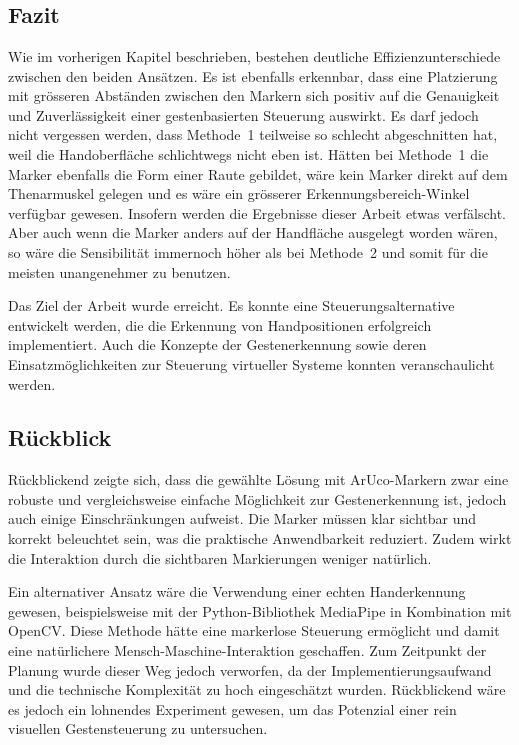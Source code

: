 \chapter{\chapFive}
\label{cha:chapter5} %

\begingroup
\fontsize{12pt}{14pt}\selectfont

\section{Fazit}
Wie im vorherigen Kapitel beschrieben, bestehen deutliche Effizienzunterschiede zwischen den beiden Ansätzen.
Es ist ebenfalls erkennbar, dass eine Platzierung mit grösseren Abständen zwischen den Markern sich positiv auf die Genauigkeit und Zuverlässigkeit einer gestenbasierten Steuerung auswirkt.
Es darf jedoch nicht vergessen werden, dass Methode~1 teilweise so schlecht abgeschnitten hat, weil die Handoberfläche schlichtwegs nicht eben ist.
Hätten bei Methode~1 die Marker ebenfalls die Form einer Raute gebildet, wäre kein Marker direkt auf dem Thenarmuskel gelegen und es wäre ein grösserer Erkennungsbereich-Winkel verfügbar gewesen.
Insofern werden die Ergebnisse dieser Arbeit etwas verfälscht.
Aber auch wenn die Marker anders auf der Handfläche ausgelegt worden wären, so wäre die Sensibilität immernoch höher als bei Methode~2 und somit für die meisten unangenehmer zu benutzen.

Das Ziel der Arbeit wurde erreicht.
Es konnte eine Steuerungsalternative entwickelt werden, die die Erkennung von Handpositionen erfolgreich implementiert.
Auch die Konzepte der Gestenerkennung sowie deren Einsatzmöglichkeiten zur Steuerung virtueller Systeme konnten veranschaulicht werden.

\section{Rückblick}

Rückblickend zeigte sich, dass die gewählte Lösung mit ArUco-Markern zwar eine robuste und vergleichsweise einfache Möglichkeit zur Gestenerkennung ist, jedoch auch einige Einschränkungen aufweist.
Die Marker müssen klar sichtbar und korrekt beleuchtet sein, was die praktische Anwendbarkeit reduziert.
Zudem wirkt die Interaktion durch die sichtbaren Markierungen weniger natürlich.

Ein alternativer Ansatz wäre die Verwendung einer echten Handerkennung gewesen, beispielsweise mit der Python-Bibliothek MediaPipe in Kombination mit OpenCV.
Diese Methode hätte eine markerlose Steuerung ermöglicht und damit eine natürlichere Mensch-Maschine-Interaktion geschaffen.
Zum Zeitpunkt der Planung wurde dieser Weg jedoch verworfen, da der Implementierungsaufwand und die technische Komplexität zu hoch eingeschätzt wurden.
Rückblickend wäre es jedoch ein lohnendes Experiment gewesen, um das Potenzial einer rein visuellen Gestensteuerung zu untersuchen.

